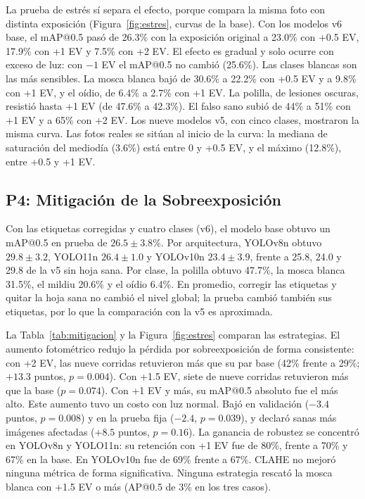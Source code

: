 \documentclass[sensors,article,submit,pdftex,moreauthors]{Definitions/mdpi}
\begin{document}
{\color{blue} La prueba de estrés sí separa el efecto, porque compara la misma foto con distinta exposición (Figura~\ref{fig:estres}, curvas de la base).} {\color{blue} Con los modelos v6 base, el mAP@0.5 pasó de 26.3\% con la exposición original a 23.0\% con +0.5 EV, 17.9\% con +1 EV y 7.5\% con +2 EV.} {\color{blue} El efecto es gradual y solo ocurre con exceso de luz: con $-1$ EV el mAP@0.5 no cambió (25.6\%).} {\color{blue} Las clases blancas son las más sensibles.} {\color{blue} La mosca blanca bajó de 30.6\% a 22.2\% con +0.5 EV y a 9.8\% con +1 EV, y el oídio, de 6.4\% a 2.7\% con +1 EV.} {\color{blue} La polilla, de lesiones oscuras, resistió hasta +1 EV (de 47.6\% a 42.3\%).} {\color{blue} El falso sano subió de 44\% a 51\% con +1 EV y a 65\% con +2 EV.} {\color{blue} Los nueve modelos v5, con cinco clases, mostraron la misma curva.} {\color{blue} Las fotos reales se sitúan al inicio de la curva: la mediana de saturación del mediodía (3.6\%) está entre 0 y +0.5 EV, y el máximo (12.8\%), entre +0.5 y +1 EV.}

\subsection{\color{blue} P4: Mitigación de la Sobreexposición}

{\color{blue} Con las etiquetas corregidas y cuatro clases (v6), el modelo base obtuvo un mAP@0.5 en prueba de $26.5 \pm 3.8\%$.} {\color{blue} Por arquitectura, YOLOv8n obtuvo $29.8 \pm 3.2$, YOLO11n $26.4 \pm 1.0$ y YOLOv10n $23.4 \pm 3.9$, frente a 25.8, 24.0 y 29.8 de la v5 sin hoja sana.} {\color{blue} Por clase, la polilla obtuvo 47.7\%, la mosca blanca 31.5\%, el mildiu 20.6\% y el oídio 6.4\%.} {\color{blue} En promedio, corregir las etiquetas y quitar la hoja sana no cambió el nivel global; la prueba cambió también sus etiquetas, por lo que la comparación con la v5 es aproximada.}

{\color{blue} La Tabla~\ref{tab:mitigacion} y la Figura~\ref{fig:estres} comparan las estrategias.} {\color{blue} El aumento fotométrico redujo la pérdida por sobreexposición de forma consistente: con +2 EV, las nueve corridas retuvieron más que su par base (42\% frente a 29\%;} {\color{blue} $+13.3$ puntos, $p = 0.004$).} {\color{blue} Con +1.5 EV, siete de nueve corridas retuvieron más que la base ($p = 0.074$).} {\color{blue} Con +1 EV y más, su mAP@0.5 absoluto fue el más alto.} {\color{blue} Este aumento tuvo un costo con luz normal.} {\color{blue} Bajó en validación ($-3.4$ puntos, $p = 0.008$) y en la prueba fija ($-2.4$, $p = 0.039$), y declaró sanas más imágenes afectadas ($+8.5$ puntos, $p = 0.16$).} {\color{blue} La ganancia de robustez se concentró en YOLOv8n y YOLO11n: su retención con +1 EV fue de 80\%, frente a 70\% y 67\% en la base.} {\color{blue} En YOLOv10n fue de 69\% frente a 67\%.} {\color{blue} CLAHE no mejoró ninguna métrica de forma significativa.} {\color{blue} Ninguna estrategia rescató la mosca blanca con +1.5 EV o más (AP@0.5 de 3\% en los tres casos).}
\end{document}
